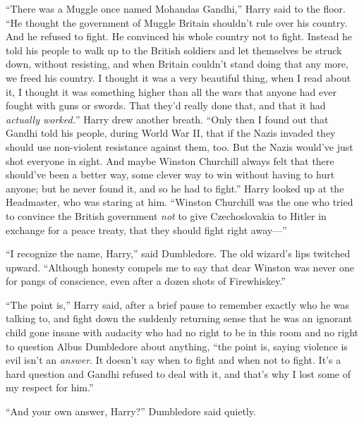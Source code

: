 “There was a Muggle once named Mohandas Gandhi,” Harry said to the floor. “He thought the government of Muggle Britain shouldn’t rule over his country. And he refused to fight. He convinced his whole country not to fight. Instead he told his people to walk up to the British soldiers and let themselves be struck down, without resisting, and when Britain couldn’t stand doing that any more, we freed his country. I thought it was a very beautiful thing, when I read about it, I thought it was something higher than all the wars that anyone had ever fought with guns or swords. That they’d really done that, and that it had \emph{actually worked.}” Harry drew another breath. “Only then I found out that Gandhi told his people, during World War II, that if the Nazis invaded they should use non-violent resistance against them, too. But the Nazis would’ve just shot everyone in sight. And maybe Winston Churchill always felt that there should’ve been a better way, some clever way to win without having to hurt anyone; but he never found it, and so he had to fight.” Harry looked up at the Headmaster, who was staring at him. “Winston Churchill was the one who tried to convince the British government \emph{not} to give Czechoslovakia to Hitler in exchange for a peace treaty, that they should fight right away—”

“I recognize the name, Harry,” said Dumbledore. The old wizard’s lips twitched upward. “Although honesty compels me to say that dear Winston was never one for pangs of conscience, even after a dozen shots of Firewhiskey.”

“The point is,” Harry said, after a brief pause to remember exactly who he was talking to, and fight down the suddenly returning sense that he was an ignorant child gone insane with audacity who had no right to be in this room and no right to question Albus Dumbledore about anything, “the point is, saying violence is evil isn’t an \emph{answer}. It doesn’t say when to fight and when not to fight. It’s a hard question and Gandhi refused to deal with it, and that’s why I lost some of my respect for him.”

“And your own answer, Harry?” Dumbledore said quietly.

